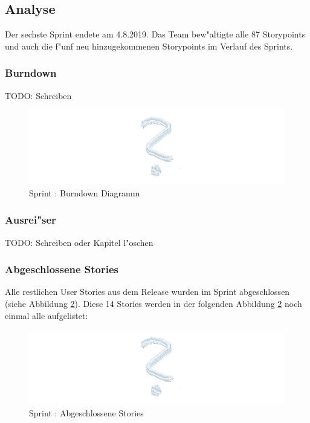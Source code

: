 \documentclass[12pt, titlepage]{scrartcl}
\newcommand{\RN}[1]{%
	\textup{\uppercase\expandafter{\romannumeral#1}}%
}
\begin{document}
    	\subsection{Analyse}
    		Der sechste Sprint endete am 4.8.2019. Das Team bew"altigte alle 87 Storypoints und auch die f"unf neu hinzugekommenen Storypoints im Verlauf des Sprints.
	    	\subsubsection{Burndown}
	    		TODO: Schreiben
	    		\begin{figure}[H] 
	    			\centering
	    			\includegraphics[width=\textwidth]{images/sprintVI/burndown.png}
	    			\caption{Sprint \RN{6}: Burndown Diagramm}
	    			\label{Burndown_6}
	    		\end{figure}
	    	\subsubsection{Ausrei"ser}
	    		TODO: Schreiben oder Kapitel l"oschen
	    	\subsubsection{Abgeschlossene Stories}
	    		Alle restlichen User Stories aus dem Release \RN{3} wurden im Sprint \RN{5} abgeschlossen (siehe Abbildung \ref{Done_Stories_6}). Diese 14 Stories werden in der folgenden Abbildung \ref{Done_Stories_6} noch einmal alle aufgelistet:
	    		\begin{figure}[H]
	    			\centering
	    			\includegraphics[width=\textwidth]{images/sprintVI/doneStories.png}
	    			\caption{Sprint \RN{6}: Abgeschlossene Stories}
	    			\label{Done_Stories_6}
	    		\end{figure}
\end{document}
